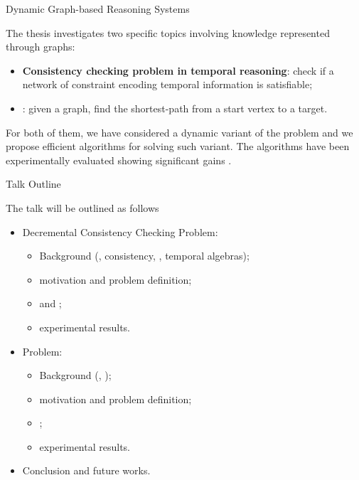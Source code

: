 \begin{frame}{Dynamic Graph-based Reasoning Systems}

    The thesis investigates two specific topics involving knowledge represented through graphs:

    \begin{itemize}
        \item \textbf{Consistency checking problem in temporal reasoning}: check if a network of constraint encoding temporal information is satisfiable;
        \item \textbf{\pathfinding{}}: given a graph, find the shortest-path from a start vertex to a target.
    \end{itemize}

    For both of them, we have considered a dynamic variant of the problem and we propose efficient algorithms for solving such variant. 
    The algorithms have been experimentally evaluated showing significant gains \wrt{} \stateofart{}.
\end{frame}

\begin{frame}{Talk Outline}

    The talk will be outlined as follows
    \begin{itemize}
        \item Decremental Consistency Checking Problem:
        \begin{itemize}
            \item Background (\CSPName{}, consistency, \tlGraphName{}, temporal algebras);
            \item motivation and problem definition;
            \item \DPASATAlgorithmName{} and \DOHSATAlgorithmName{};
            \item experimental results.
        \end{itemize}
        \item \SAPFEC{} Problem:
        \begin{itemize}
            \item Background (\pathfinding{}, \CPD{});
            \item motivation and problem definition;
            \item \CPDSearch{};
            \item experimental results.
        \end{itemize}
        \item Conclusion and future works.
    \end{itemize}
\end{frame}
